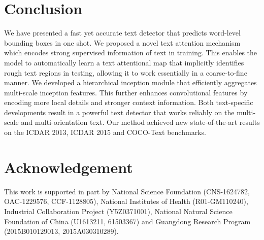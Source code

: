 \documentclass[10pt,twocolumn,letterpaper]{article}
\begin{document}
\section{Conclusion}
We have presented a fast yet accurate text detector that predicts word-level bounding boxes in one shot. We proposed a novel text attention mechanism which encodes strong supervised information of text in training. This enables the model to automatically learn a text attentional map that implicitly identifies rough text regions in testing, allowing it to work essentially in a coarse-to-fine manner. We developed a hierarchical inception module that efficiently aggregates multi-scale inception features. This further enhances convolutional features by encoding more local details and stronger context information. Both text-specific developments result in a powerful text detector that works reliably on the multi-scale and multi-orientation text. Our method achieved new state-of-the-art results on the ICDAR 2013, ICDAR 2015 and COCO-Text benchmarks.

\section*{Acknowledgement}
This work is supported in part by National Science Foundation (CNS-1624782, OAC-1229576, CCF-1128805), National Institutes of Health (R01-GM110240), Industrial Collaboration Project (Y5Z0371001), National Natural Science Foundation of China (U1613211, 61503367) and Guangdong Research Program (2015B010129013, 2015A030310289).

{\small


}
\end{document}
